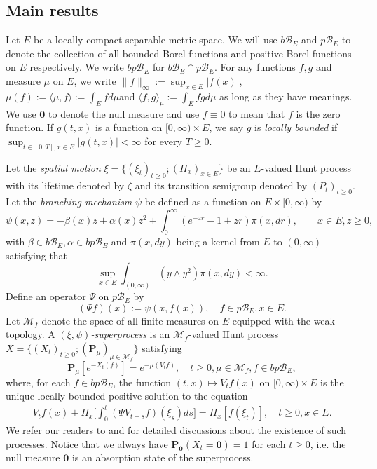 \documentclass[UTF8]{pkuthss}
\theoremstyle{plain}
\theoremstyle{definition}
\numberwithin{equation}{section}
\begin{document}
\subsection{Main results}	
\label{sec: Main results}
	Let $E$ be a locally compact separable metric space.
	We will use $b\mathscr B_E$ and $p\mathscr B_E$ to denote the collection of all bounded Borel functions and positive Borel functions on $E$ respectively.
	We write $bp\mathscr B_E$ for $b\mathscr B_E \cap p\mathscr B_E$.
	For any functions $f,g$ and measure $\mu$ on $E$, we write $\|f\|_\infty := \sup_{x\in E} |f(x)|$, $\mu(f) :=\langle \mu,f \rangle:= \int_E f d\mu$and $\langle f,g \rangle_\mu := \int_E fg d\mu$ as long as they have meanings.
	We use $\mathbf 0$ to denote the null measure and use $f\equiv 0$ to mean that $f$ is the zero function.
	If $g(t,x)$ is a function on $[0,\infty)\times E$, we say $g$ is \emph{locally bounded} if $\sup_{t\in [0,T],x\in E} |g(t,x)|<\infty$ for every $T\geq 0$.

	Let the \emph{spatial motion} $\xi=\{(\xi_t)_{t\geq 0};(\Pi_x)_{x\in E}\}$ be an $E$-valued Hunt process with its lifetime denoted by $\zeta$ and its transition semigroup denoted by $(P_t)_{t\geq 0}$.
	Let the \emph{branching mechanism} $\psi$ be defined as a function on $E\times[0,\infty)$ by
\[
 	\psi(x,z) 
 	= -\beta(x)z + \alpha(x)z^2+\int_0^\infty (e^{-zr}-1+zr )\pi(x, dr),
 	\qquad x\in E, z\geq0,
\]
	with $\beta\in b\mathscr B_E,\alpha\in bp\mathscr B_E$ and $\pi(x,dy)$ being a kernel from $E$ to $(0,\infty)$ satisfying that \[\sup_{x\in E} \int_{(0,\infty)} (y\wedge y^2) \pi(x,dy) < \infty.\]
	Define an operator $\Psi$ on $p\mathscr B_E$ by
\[
	(\Psi f) (x)
	:= \psi(x,f(x)),
	\quad f\in p\mathscr B_E, x\in E.
\]
	Let $\mathcal M_f$ denote the space of all finite measures on $E$ equipped with the weak topology.
	A \emph{$(\xi,\psi)$-superprocess} is an $\mathcal M_f$-valued Hunt process $X=\{(X_t)_{t\geq 0}; (\mathbf P_\mu)_{\mu \in \mathcal M_f}\}$ satisfying
\begin{equation}
\label{eq: Defi of Vt}
 	\mathbf P_\mu [e^{-X_t(f)}] = e^{-\mu(V_tf)},
 	\quad t\geq 0, \mu \in \mathcal M_f, f\in bp\mathscr B_E,
\end{equation}
  where, for each $f\in bp\mathscr B_E$, the function $(t,x) \mapsto V_tf(x)$ on $[0,\infty) \times E$ is the unique locally bounded positive solution to the equation
\begin{align}\label{eq: chap 3 FKPP_in_definition}
  	V_t f(x) + \Pi_x \Big[ \int_0^t (\Psi V_{t-s} f)(\xi_s) ds \Big]
	=\Pi_x[f(\xi_t)], \quad t \geq 0, x\in E.
\end{align}
	We refer our readers to \cite{Dawson1993Measure-valued, Dynkin1993Superprocesses}
	and \cite[Section 2.3 \& Theorem 5.11]{Li2011Measure-valued}
	for detailed discussions about the existence of such processes.
	Notice that we always have $\mathbf P_{\mathbf 0}(X_t = \mathbf 0) = 1$ for each $t\geq 0$, i.e. the null measure $\mathbf 0$ is an absorption state of the superprocess.
\end{document}
